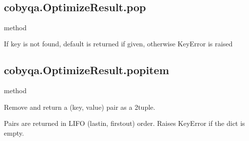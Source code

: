 \documentclass[letterpaper,10pt,english]{sphinxmanual}
\begin{document}
\begin{fulllineitems}
\begin{fulllineitems}
\label{\detokenize{refs/generated/cobyqa.OptimizeResult.keys:cobyqa.OptimizeResult.keys}}~
\end{fulllineitems}



\subsection{cobyqa.OptimizeResult.pop}
\label{\detokenize{refs/generated/cobyqa.OptimizeResult.pop:cobyqa-optimizeresult-pop}}\label{\detokenize{refs/generated/cobyqa.OptimizeResult.pop::doc}}
\sphinxAtStartPar
method

\begin{fulllineitems}
\label{\detokenize{refs/generated/cobyqa.OptimizeResult.pop:cobyqa.OptimizeResult.pop}}
\sphinxAtStartPar
If key is not found, default is returned if given, otherwise KeyError is raised

\end{fulllineitems}



\subsection{cobyqa.OptimizeResult.popitem}
\label{\detokenize{refs/generated/cobyqa.OptimizeResult.popitem:cobyqa-optimizeresult-popitem}}\label{\detokenize{refs/generated/cobyqa.OptimizeResult.popitem::doc}}
\sphinxAtStartPar
method

\begin{fulllineitems}
\label{\detokenize{refs/generated/cobyqa.OptimizeResult.popitem:cobyqa.OptimizeResult.popitem}}
\sphinxAtStartPar
Remove and return a (key, value) pair as a 2\sphinxhyphen{}tuple.

\sphinxAtStartPar
Pairs are returned in LIFO (last\sphinxhyphen{}in, first\sphinxhyphen{}out) order.
Raises KeyError if the dict is empty.


\end{fulllineitems}
\end{fulllineitems}
\end{document}
